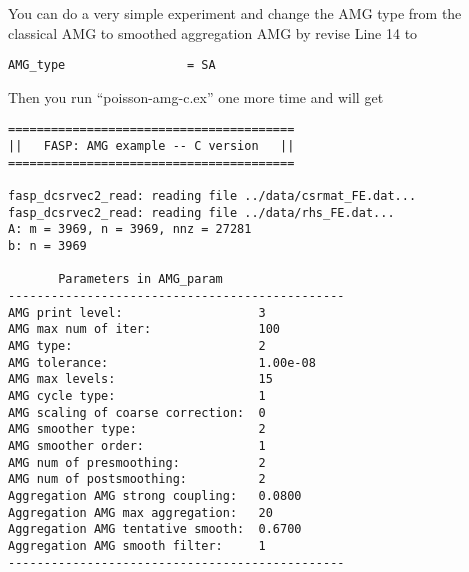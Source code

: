 \documentclass[11pt]{memoir}
\begin{document}
You can do a very simple experiment and change the AMG type from the classical AMG to smoothed aggregation AMG by revise Line 14 to
%
\begin{lstlisting}[numbers=none]
AMG_type                 = SA
\end{lstlisting}
%
Then you run ``poisson-amg-c.ex'' one more time and will get
%
\begin{lstlisting}[numbers=none]
========================================
||   FASP: AMG example -- C version   ||
========================================

fasp_dcsrvec2_read: reading file ../data/csrmat_FE.dat...
fasp_dcsrvec2_read: reading file ../data/rhs_FE.dat...
A: m = 3969, n = 3969, nnz = 27281
b: n = 3969

       Parameters in AMG_param
-----------------------------------------------
AMG print level:                   3
AMG max num of iter:               100
AMG type:                          2
AMG tolerance:                     1.00e-08
AMG max levels:                    15
AMG cycle type:                    1
AMG scaling of coarse correction:  0
AMG smoother type:                 2
AMG smoother order:                1
AMG num of presmoothing:           2
AMG num of postsmoothing:          2
Aggregation AMG strong coupling:   0.0800
Aggregation AMG max aggregation:   20
Aggregation AMG tentative smooth:  0.6700
Aggregation AMG smooth filter:     1
-----------------------------------------------


\end{lstlisting}
\end{document}
